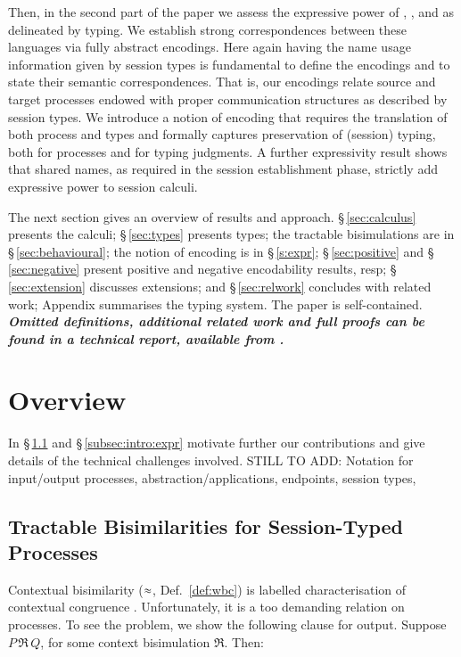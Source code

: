 Then, in the second part of the paper we assess the expressive 
power of \HOp, \HO, and \sessp as delineated by typing. 
We establish strong correspondences between 
these languages via fully abstract encodings. 
Here again having the name usage information given by session types is fundamental to define the encodings
and to state their semantic correspondences.
That is, our encodings relate source and target processes
endowed with proper communication structures as described by session types. 
We introduce a notion of encoding that 
requires the translation of both process and types and 
formally captures preservation of (session) typing,
both for processes and for typing judgments. 
A further expressivity result shows that shared names, 
as required in the session establishment phase,
 strictly add expressive power 
to session calculi. 
\smallskip

The next section gives an overview of results and approach.
\noi \S\,\ref{sec:calculus} presents the calculi; 
\S\,\ref{sec:types} presents types;
the tractable bisimulations are in \S\,\ref{sec:behavioural};
the notion of encoding is in \S\,\ref{s:expr};
\S\,\ref{sec:positive} and \S\,\ref{sec:negative}
present positive and negative encodability results, resp;
\S\,\ref{sec:extension} discusses extensions; and 
\S\,\ref{sec:relwork} concludes with related work;
Appendix summarises the typing system. 
The paper is self-contained. 
{\bf\em Omitted definitions, additional related work and full proofs can be found 
in a technical report, available from \cite{KouzapasPY15}.} 

\section{Overview}
\label{sec:overview}
\noi
In  \S\,\ref{subsec:intro:bisimulation}
and
\S\,\ref{subsec:intro:expr}
motivate further our contributions and 
give details of the technical challenges involved. 
STILL TO ADD: Notation for input/output processes, abstraction/applications, endpoints, 
session types, 


\subsection{Tractable Bisimilarities for Session-Typed Processes}
\label{subsec:intro:bisimulation}
\noi 
{}
Contextual bisimilarity ($\approx$, Def.~\ref{def:wbc}) is 
labelled characterisation of contextual congruence 
\cite{SaWabook}. 
Unfortunately, it is a too demanding relation on processes. 
To see the problem, we show 
the following clause for output.
Suppose $P \,\Re\, Q$, for some context bisimulation $\Re$. Then:

